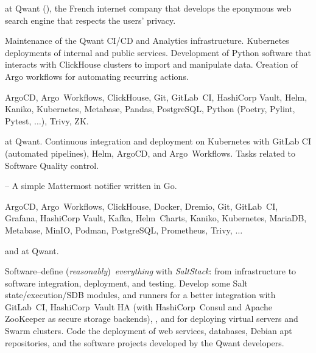 
 at Qwant (),
the French internet company that develops the eponymous web search engine that
respects the users' privacy.

\smallskip\noindent
\tasks
Maintenance of the Qwant CI/CD and Analytics infrastructure.
Kubernetes deployments of internal and public services.
Development of Python software that interacts with ClickHouse clusters to import
and manipulate data.
Creation of Argo workflows for automating recurring actions.

\smallskip\noindent
\technologies
ArgoCD, Argo~Workflows, ClickHouse, Git, GitLab~CI,
HashiCorp Vault, Helm, Kaniko, Kubernetes, Metabase, Pandas, PostgreSQL,
Python (Poetry, Pylint, Pytest, $\dots$), Trivy, ZK.



 at Qwant.
\smallskip\noindent
\tasks
Continuous integration and deployment on Kubernetes with
GitLab CI (automated pipelines), Helm, ArgoCD, and Argo~Workflows.
Tasks related to Software Quality control.

\smallskip\noindent
\software
{} --
A simple Mattermost notifier written in Go.

\smallskip\noindent
\technologies
ArgoCD, Argo~Workflows, ClickHouse, Docker, Dremio, Git, GitLab~CI, Grafana,
HashiCorp Vault, Kafka, Helm~Charts, Kaniko, Kubernetes, MariaDB, Metabase,
MinIO, Podman, PostgreSQL, Prometheus, Trivy, $\dots$



 and  at Qwant.

\smallskip\noindent
\tasks
Software--define ({\it reasonably}\/)~{\it everything\/} with {\it SaltStack\/}:
from infrastructure to software integration, deployment, and testing.
Develop some Salt state/execution/SDB modules, and runners for a better
integration with GitLab~CI, HashiCorp~Vault HA (with HashiCorp~Consul and
Apache ZooKeeper as secure storage backends), \phpIPAM{}, and for deploying
virtual servers and Swarm clusters.
Code the deployment of web services, databases, Debian apt repositories, and the
software projects developed by the Qwant developers.

